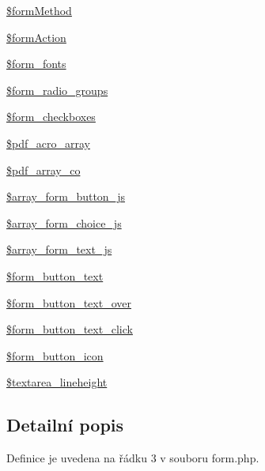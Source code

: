 \begin{DoxyCompactItemize}
\item 
\hyperlink{classform_a1794de12abbbf034b0848b87e7105094}{\$form\-Method}
\item 
\hyperlink{classform_a78e01a727f5e89bc37251c85a52b6d77}{\$form\-Action}
\item 
\hyperlink{classform_a6bc82fbec76a214fc5779614d6041a7f}{\$form\-\_\-fonts}
\item 
\hyperlink{classform_a163d1f36c65e76a18eb3d6ed25b71a53}{\$form\-\_\-radio\-\_\-groups}
\item 
\hyperlink{classform_ada7e815926ed805332ab2abb6c5faa6b}{\$form\-\_\-checkboxes}
\item 
\hyperlink{classform_a1131119fb5ac1a1907a5c4830a710322}{\$pdf\-\_\-acro\-\_\-array}
\item 
\hyperlink{classform_a15a296bb9cebb0c6edc191ff8194b4a9}{\$pdf\-\_\-array\-\_\-co}
\item 
\hyperlink{classform_ad53a238e14d004340fc818fb85b20dde}{\$array\-\_\-form\-\_\-button\-\_\-js}
\item 
\hyperlink{classform_a75d77dd70ea8d99f72e7aa228c87d5ad}{\$array\-\_\-form\-\_\-choice\-\_\-js}
\item 
\hyperlink{classform_a9294bfde7f7e7b436920bc7c497a2ee9}{\$array\-\_\-form\-\_\-text\-\_\-js}
\item 
\hyperlink{classform_acd9cd61e2aa1ffa8fc8e069165902350}{\$form\-\_\-button\-\_\-text}
\item 
\hyperlink{classform_ab6c6802c6ae2eb929943a0f590d007ee}{\$form\-\_\-button\-\_\-text\-\_\-over}
\item 
\hyperlink{classform_a04891117a1fa3474cb2592b03f489c83}{\$form\-\_\-button\-\_\-text\-\_\-click}
\item 
\hyperlink{classform_a37c3504b48d530720082d4b653ea2f5e}{\$form\-\_\-button\-\_\-icon}
\item 
\hyperlink{classform_a1e001f1e7be1b653cb72c9867601adab}{\$textarea\-\_\-lineheight}
\end{DoxyCompactItemize}


\subsection{Detailní popis}


Definice je uvedena na řádku 3 v souboru form.\-php.




